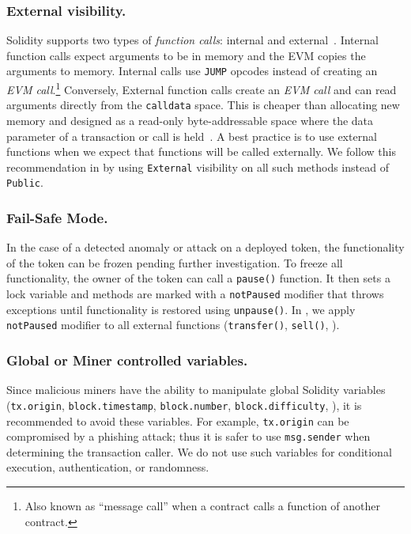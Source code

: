 \subsubsection{External visibility.}

Solidity supports two types of \textit{function calls}: internal and external~\cite{SolidityDoc}. Internal function calls expect arguments to be in memory and the EVM copies the arguments to memory. Internal calls use \texttt{JUMP} opcodes instead of creating an \textit{EVM call}.\footnote{Also known as ``message call'' when a contract calls a function of another contract.} Conversely, External function calls create an \textit{EVM call} and can read arguments directly from the \texttt{calldata} space. This is cheaper than allocating new memory and designed as a read-only byte-addressable space where the data parameter of a transaction or call is held~\cite{EthInDepth}. A best practice is to use external functions when we expect that functions will be called externally. We follow this recommendation in \sys by using \texttt{External} visibility on all such methods instead of \texttt{Public}. 

\subsubsection{Fail-Safe Mode.}

In the case of a detected anomaly or attack on a deployed \erc token, the functionality of the token can be frozen pending further investigation. To freeze all functionality, the owner of the token can call a \texttt{pause()} function. It then sets a lock variable and methods are marked with a \texttt{notPaused} modifier that throws exceptions until functionality is restored using \texttt{unpause()}. In \sys, we apply \texttt{notPaused} modifier to all external functions (\eg \texttt{transfer()}, \texttt{sell()}, \etc).

\subsubsection{Global or Miner controlled variables.}

Since malicious miners have the ability to manipulate global Solidity variables (\eg \texttt{tx.origin}, \texttt{block.timestamp}, \texttt{block.number}, \texttt{block.difficulty}, \etc), it is recommended to avoid these variables. For example, \texttt{tx.origin} can be compromised by a phishing attack; thus it is safer to use \texttt{msg.sender} when determining the transaction caller. We do not use such variables for conditional execution, authentication, or randomness.

